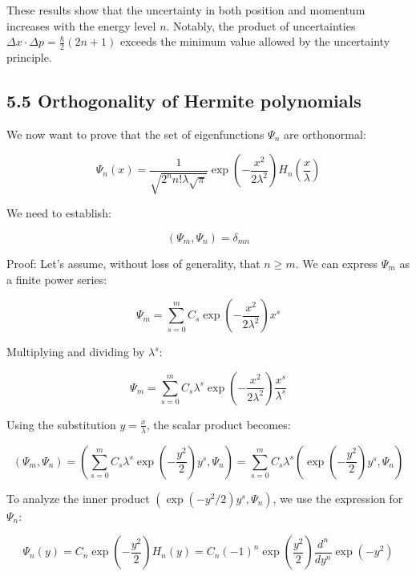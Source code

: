 \documentclass[italian]{HKNdocument}
\begin{document}
These results show that the uncertainty in both position and momentum increases with the energy level $n$. Notably, the product of uncertainties $\Delta x \cdot \Delta p = \frac{\hbar}{2}(2n+1)$ exceeds the minimum value allowed by the uncertainty principle.

\subsection*{5.5 Orthogonality of Hermite polynomials}

We now want to prove that the set of eigenfunctions $\Psi_n$ are orthonormal:

\begin{equation*}
\Psi_n(x) = \frac{1}{\sqrt{2^n n!\lambda\sqrt{\pi}}}\exp\left(-\frac{x^2}{2\lambda^2}\right)H_n\left(\frac{x}{\lambda}\right) \tag{5.63}
\end{equation*}

We need to establish:

\begin{equation*}
(\Psi_m, \Psi_n) = \delta_{mn} \tag{5.64}
\end{equation*}

Proof: Let's assume, without loss of generality, that $n \geq m$. We can express $\Psi_m$ as a finite power series:

\begin{equation*}
\Psi_m = \sum_{s=0}^m C_s\exp\left(-\frac{x^2}{2\lambda^2}\right)x^s \tag{5.65}
\end{equation*}

Multiplying and dividing by $\lambda^s$:

\begin{equation*}
\Psi_m = \sum_{s=0}^m C_s\lambda^s\exp\left(-\frac{x^2}{2\lambda^2}\right)\frac{x^s}{\lambda^s} \tag{5.66}
\end{equation*}

Using the substitution $y = \frac{x}{\lambda}$, the scalar product becomes:

\begin{equation*}
(\Psi_m, \Psi_n) = \left(\sum_{s=0}^m C_s\lambda^s\exp\left(-\frac{y^2}{2}\right)y^s, \Psi_n\right) = \sum_{s=0}^m C_s\lambda^s\left(\exp\left(-\frac{y^2}{2}\right)y^s, \Psi_n\right) \tag{5.67}
\end{equation*}

To analyze the inner product $\left(\exp\left(-y^2/2\right)y^s, \Psi_n\right)$, we use the expression for $\Psi_n$:

\begin{equation*}
\Psi_n(y) = C_n\exp\left(-\frac{y^2}{2}\right)H_n(y) = C_n(-1)^n\exp\left(\frac{y^2}{2}\right)\frac{d^n}{dy^n}\exp(-y^2) \tag{5.68}
\end{equation*}
\end{document}
